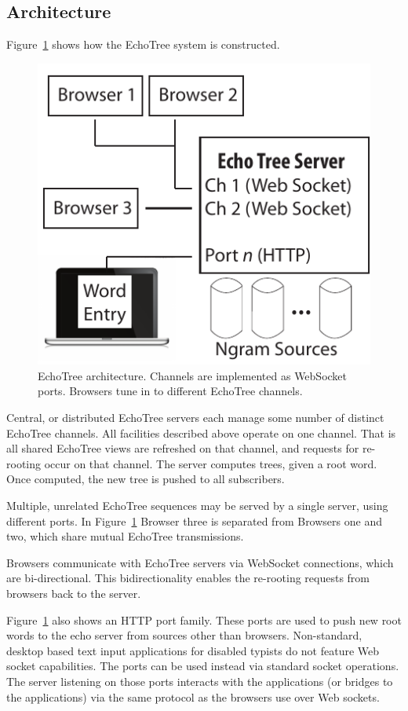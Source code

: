 \documentclass{sigchi}
\begin{document}
\subsection{Architecture}

Figure~\ref{fig:arch} shows how the EchoTree system is
constructed. 
\begin{figure}
   \centering
   \includegraphics[width=0.5\columnwidth]{Figs/echoTreeArch.pdf}
   \caption{EchoTree architecture. Channels are implemented as
     WebSocket ports. Browsers tune in to different EchoTree channels.}
   \label{fig:arch}
\end{figure}
Central, or distributed EchoTree servers each manage some number of
distinct EchoTree channels. All facilities described above operate on
one channel. That is all shared EchoTree views are refreshed on that
channel, and requests for re-rooting occur on that channel. The server
computes trees, given a root word. Once computed, the new tree is
pushed to all subscribers.

Multiple, unrelated EchoTree sequences may be served by a single
server, using different ports. In Figure~\ref{fig:arch} Browser three
is separated from Browsers one and two, which share mutual EchoTree
transmissions.

Browsers communicate with EchoTree servers via WebSocket connections,
which are bi-directional. This bidirectionality enables the re-rooting
requests from browsers back to the server.

Figure~\ref{fig:arch} also shows an HTTP port family. These ports are
used to push new root words to the echo server from sources other than
browsers. Non-standard, desktop based text input applications for
disabled typists do not feature Web socket capabilities. The ports can
be used instead via standard socket operations. The server listening
on those ports interacts with the applications (or bridges to the
applications) via the same protocol as the browsers use over Web
sockets.  
\end{document}
